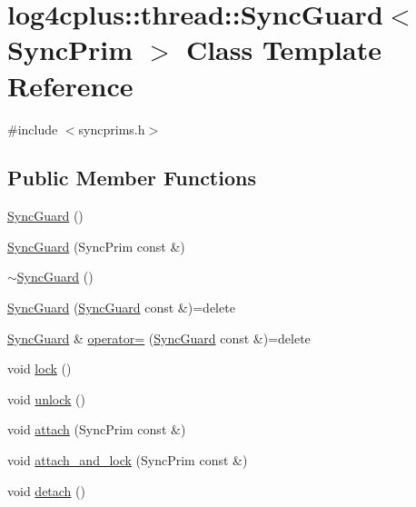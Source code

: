 \hypertarget{classlog4cplus_1_1thread_1_1SyncGuard}{\section{log4cplus\-:\-:thread\-:\-:Sync\-Guard$<$ Sync\-Prim $>$ Class Template Reference}
\label{classlog4cplus_1_1thread_1_1SyncGuard}
}


{\ttfamily \#include $<$syncprims.\-h$>$}

\subsection*{Public Member Functions}
\begin{DoxyCompactItemize}
\item 
\hyperlink{classlog4cplus_1_1thread_1_1SyncGuard_a7c5062789f038cba8c77360865ecab51}{Sync\-Guard} ()
\item 
\hyperlink{classlog4cplus_1_1thread_1_1SyncGuard_ad60279e8b36ec1e48bdf587f2af12982}{Sync\-Guard} (Sync\-Prim const \&)
\item 
\hyperlink{classlog4cplus_1_1thread_1_1SyncGuard_ac92b9075ab092380faba2bb32ccf6e03}{$\sim$\-Sync\-Guard} ()
\item 
\hyperlink{classlog4cplus_1_1thread_1_1SyncGuard_ae8d1cec9e3845d9eb688221f9585d9d8}{Sync\-Guard} (\hyperlink{classlog4cplus_1_1thread_1_1SyncGuard}{Sync\-Guard} const \&)=delete
\item 
\hyperlink{classlog4cplus_1_1thread_1_1SyncGuard}{Sync\-Guard} \& \hyperlink{classlog4cplus_1_1thread_1_1SyncGuard_a968f1c224651bc72f9433f1033bb1ca8}{operator=} (\hyperlink{classlog4cplus_1_1thread_1_1SyncGuard}{Sync\-Guard} const \&)=delete
\item 
void \hyperlink{classlog4cplus_1_1thread_1_1SyncGuard_abdb66a9b5dad1b40e787b2091510d2ee}{lock} ()
\item 
void \hyperlink{classlog4cplus_1_1thread_1_1SyncGuard_ac7379219082731cc7e70bd64000c10da}{unlock} ()
\item 
void \hyperlink{classlog4cplus_1_1thread_1_1SyncGuard_af882bbae8628e3db53fb8514f4322005}{attach} (Sync\-Prim const \&)
\item 
void \hyperlink{classlog4cplus_1_1thread_1_1SyncGuard_aa9fa5dd189601e910242c89b69833842}{attach\-\_\-and\-\_\-lock} (Sync\-Prim const \&)
\item 
void \hyperlink{classlog4cplus_1_1thread_1_1SyncGuard_a49a88201cfad90965c0ce81fd80542e3}{detach} ()
\end{DoxyCompactItemize}


